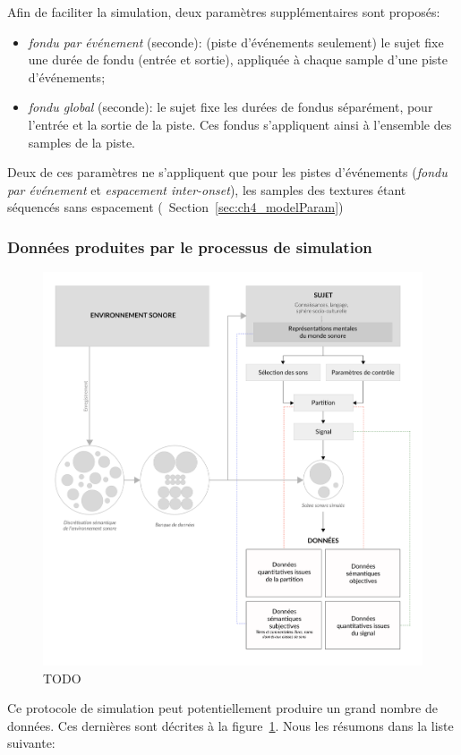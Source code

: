 Afin de faciliter la simulation, deux paramètres supplémentaires sont proposés:

\begin{itemize}
\item \emph{fondu par événement} (seconde): (piste d'événements seulement) le sujet fixe une durée de fondu (entrée et sortie), appliquée à chaque sample d'une piste d'événements;
\item \emph{fondu global} (seconde): le sujet fixe les durées de fondus séparément, pour l'entrée et la sortie de la piste. Ces fondus s'appliquent ainsi à l'ensemble des samples de la piste.
\end{itemize}

Deux de ces paramètres ne s’appliquent que pour les pistes d'événements (\emph{fondu par événement} et \emph{espacement inter-onset}), les samples des textures étant séquencés sans espacement (\cf~Section~\ref{sec:ch4_modelParam})

\subsubsection{Données produites par le processus de simulation}

\begin{figure}[t]
        \myfloatalign
        \includegraphics[width=.8\linewidth]{gfx/schemaXP}
       \caption{TODO}\label{fig:paradigmeSimu2}
\end{figure}

Ce protocole de simulation peut potentiellement produire un grand nombre de données. Ces dernières sont décrites à la figure~\ref{fig:paradigmeSimu2}.  Nous les résumons dans la liste suivante:

